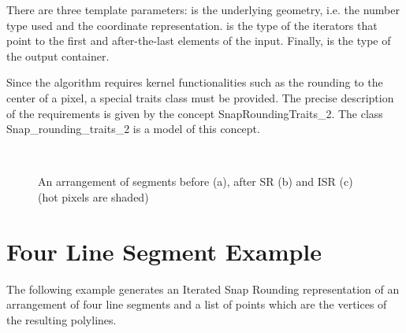 There are three template parameters:  is the underlying geometry, i.e. the number type used
and the coordinate representation.  is the type of the iterators that point to the first
and after-the-last elements of the input. Finally,  is the type of the output container.

Since the algorithm requires kernel functionalities such as the rounding to the center of a pixel, a special
traits class must be provided. The precise description of the requirements is given by the
concept SnapRoundingTraits\_2. The class Snap\_rounding\_traits\_2 is a model of this concept.

\begin{figure}
\begin{center}
\  \
\end{center}
\vspace{-2ex}
\caption{An arrangement of segments before (a), after SR (b)
and ISR (c) (hot pixels are shaded)}
\label{fig:isr_vs_sr}
\end{figure}

\section{Four Line Segment Example}

The following example generates an Iterated Snap Rounding representation
of an arrangement of four line segments
and a list of points which are the vertices of the resulting polylines.







